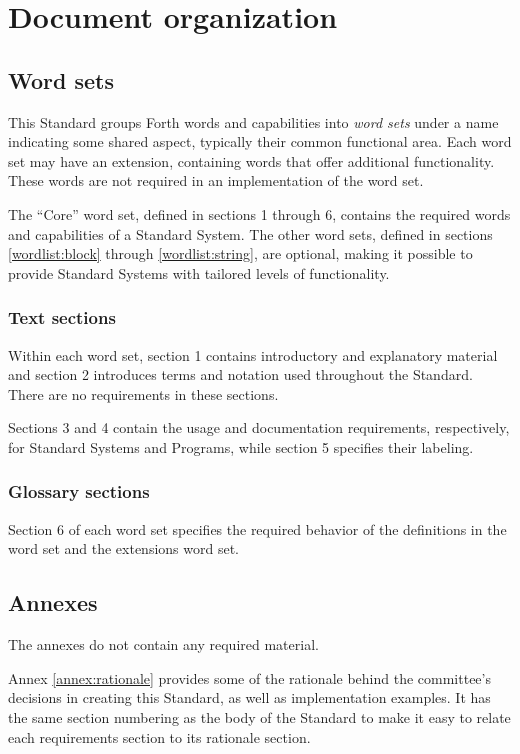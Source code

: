 \section{Document organization}

\subsection{Word sets}
This Standard groups Forth words and capabilities into \emph{word sets}
under a name indicating some shared aspect, typically their common
functional area. Each word set may have an extension, containing words
that offer additional functionality. These words are not required in an
implementation of the word set.

The ``Core'' word set, defined in sections 1 through 6, contains the
required words and capabilities of a Standard System. The other word
sets, defined in sections \ref{wordlist:block} through
\ref{wordlist:string}, are optional, making it possible to provide
Standard Systems with tailored levels of functionality.

\subsubsection{Text sections}

Within each word set, section 1 contains introductory and explanatory
material and section 2 introduces terms and notation used throughout
the Standard. There are no requirements in these sections.

Sections 3 and 4 contain the usage and documentation requirements,
respectively, for Standard Systems and Programs, while section 5
specifies their labeling.

\subsubsection{Glossary sections}

Section 6 of each word set specifies the required behavior of the
definitions in the word set and the extensions word set.

\subsection{Annexes}

The annexes do not contain any required material.

Annex \ref{annex:rationale} provides some of the rationale behind the
committee's decisions in creating this Standard, as well as
implementation examples. It has the same section numbering as the
body of the Standard to make it easy to relate each requirements
section to its rationale section.

